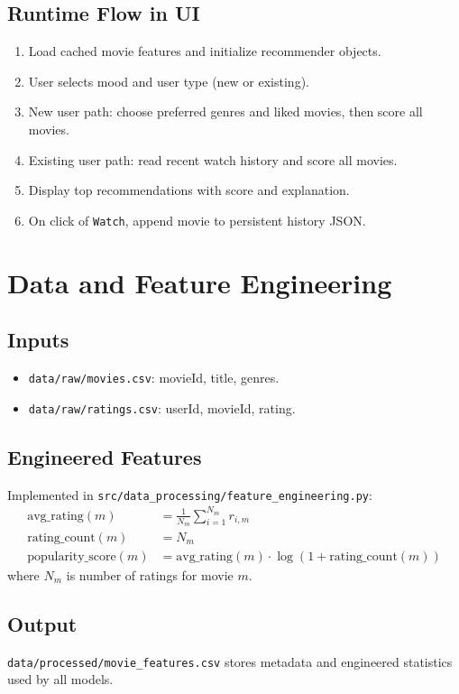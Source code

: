 \documentclass[11pt,a4paper]{article}
\begin{document}
\subsection{Runtime Flow in UI}
\begin{enumerate}[leftmargin=1.5em]
    \item Load cached movie features and initialize recommender objects.
    \item User selects mood and user type (new or existing).
    \item New user path: choose preferred genres and liked movies, then score all movies.
    \item Existing user path: read recent watch history and score all movies.
    \item Display top recommendations with score and explanation.
    \item On click of \texttt{Watch}, append movie to persistent history JSON.
\end{enumerate}

\section{Data and Feature Engineering}
\subsection{Inputs}
\begin{itemize}[leftmargin=1.5em]
    \item \texttt{data/raw/movies.csv}: movieId, title, genres.
    \item \texttt{data/raw/ratings.csv}: userId, movieId, rating.
\end{itemize}

\subsection{Engineered Features}
Implemented in \texttt{src/data\_processing/feature\_engineering.py}:
\begin{align}
\text{avg\_rating}(m) &= \frac{1}{N_m}\sum_{i=1}^{N_m} r_{i,m} \\
\text{rating\_count}(m) &= N_m \\
\text{popularity\_score}(m) &= \text{avg\_rating}(m) \cdot \log(1 + \text{rating\_count}(m))
\end{align}
where $N_m$ is number of ratings for movie $m$.

\subsection{Output}
\texttt{data/processed/movie\_features.csv} stores metadata and engineered statistics used by all models.
\end{document}
